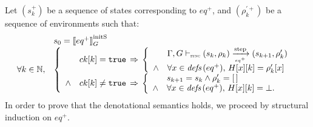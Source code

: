 \begin{skippableproof}
    Let $(s_k^+)$ be a sequence of states corresponding to $eq^+$, and $(\rho_k^{\prime+})$ be a
    sequence of environments such that:
    \begin{equation*}
        \begin{array}{ll}
                              & s_0 = \initstate{eq^+} \\
            \forall k \in \N, &
            \left\{
            \begin{array}{ll}
                       & ck[k] = \true \, \Rightarrow \,
                \left\{
                \begin{array}{ll}
                           & \eqOpsem{\rho_k}{s_k}{eq^+}{s_{k+1}}{\rho'_k}      \\
                    \wedge & \forall x \in \defs{eq^+}, \, H[x][k] = \rho'_k[x] \\
                \end{array}
                \right.                                     \\
                \wedge & ck[k] \neq \true \, \Rightarrow \,
                \left\{
                \begin{array}{ll}
                           & s_{k+1} = s_k \wedge \rho'_k = \emptyrho       \\
                    \wedge & \forall x \in \defs{eq^+}, \,  H[x][k] = \bot. \\
                \end{array}
                \right.                                     \\
            \end{array}
            \right.
        \end{array}
    \end{equation*}
    In order to prove that the denotational semantics  holds, we proceed by
    structural induction on $eq^+$.


\end{skippableproof}
